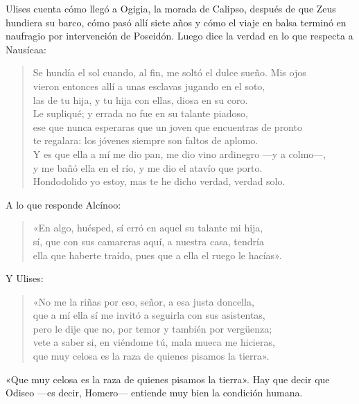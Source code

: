 \documentclass[11pt,a4paper]{article}
\begin{document}
Ulises cuenta cómo llegó a Ogigia, la morada de Calipso, después de que Zeus hundiera su barco, cómo pasó allí siete años y cómo el viaje en balsa terminó en naufragio por intervención de Poseidón. Luego dice la verdad en lo que respecta a Nausícaa:

\begin{verse}
Se hundía el sol cuando, al fin, me soltó el dulce sueño. Mis ojos\\
vieron entonces allí a unas esclavas jugando en el soto,\\
las de tu hija, y tu hija con ellas, diosa en su coro.\\
Le supliqué; y errada no fue en su talante piadoso,\\
ese que nunca esperaras que un joven que encuentras de pronto\\
te regalara: los jóvenes siempre son faltos de aplomo.\\
Y es que ella a mí me dio pan, me dio vino ardinegro ---y a colmo---,\\
y me bañó ella en el río, y me dio el atavío que porto.\\
Hondodolido yo estoy, mas te he dicho verdad, verdad solo.
\end{verse}

A lo que responde Alcínoo:

\begin{verse}
«En algo, huésped, sí erró en aquel su talante mi hija,\\
sí, que con sus camareras aquí, a nuestra casa, tendría\\
ella que haberte traído, pues que a ella el ruego le hacías».
\end{verse}

Y Ulises:

\begin{verse}
«No me la riñas por eso, señor, a esa justa doncella,\\
que a mí ella sí me invitó a seguirla con sus asistentas,\\
pero le dije que no, por temor y también por vergüenza;\\
vete a saber si, en viéndome tú, mala mueca me hicieras,\\
que muy celosa es la raza de quienes pisamos la tierra».
\end{verse}

«Que muy celosa es la raza de quienes pisamos la tierra». Hay que decir que Odiseo ---es decir, Homero--- entiende muy bien la condición humana.
\end{document}
